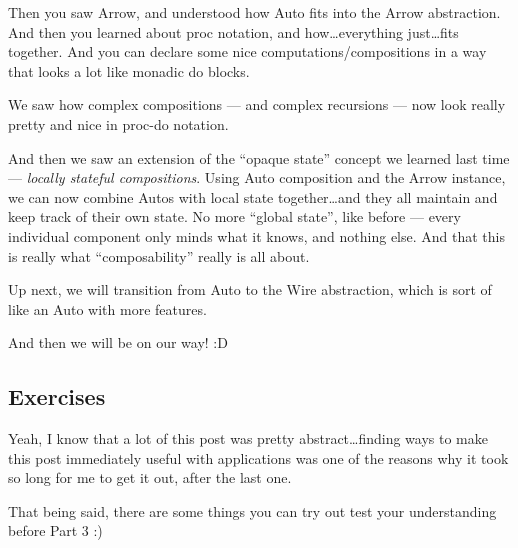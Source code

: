 \documentclass[]{article}
\begin{document}
Then you saw Arrow, and understood how Auto fits into the Arrow abstraction. And
then you learned about proc notation, and how\ldots everything just\ldots fits
together. And you can declare some nice computations/compositions in a way that
looks a lot like monadic do blocks.

We saw how complex compositions --- and complex recursions --- now look really
pretty and nice in proc-do notation.

And then we saw an extension of the ``opaque state'' concept we learned last
time --- \emph{locally stateful compositions}. Using Auto composition and the
Arrow instance, we can now combine Autos with local state together\ldots and
they all maintain and keep track of their own state. No more ``global state'',
like before --- every individual component only minds what it knows, and nothing
else. And that this is really what ``composability'' really is all about.

Up next, we will transition from Auto to the Wire abstraction, which is sort of
like an Auto with more features.

And then we will be on our way! :D

\hypertarget{exercises}{%
\subsection{Exercises}\label{exercises}}

Yeah, I know that a lot of this post was pretty abstract\ldots finding ways to
make this post immediately useful with applications was one of the reasons why
it took so long for me to get it out, after the last one.

That being said, there are some things you can try out test your understanding
before Part 3 :)
\end{document}
